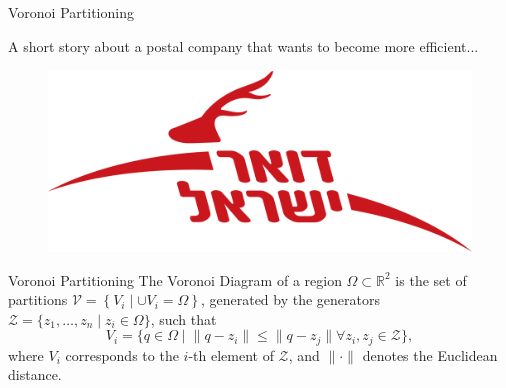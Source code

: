 \documentclass[t]{beamer}
\newcommand{\rsqr}{\mathbb{R}^2}
\begin{document}
\subsection[Voronoi Partitioning]{}
\begin{frame}[label=vorpart1]{Voronoi Partitioning}
\begin{center}
A short story about a postal company that wants to become more efficient...
\end{center}
\begin{figure}
\centering
\includegraphics[scale=0.1]{background/israelpost-logo.png}
\end{figure}
\end{frame}
\begin{frame}[label=vorpart2]{Voronoi Partitioning}
The Voronoi Diagram of a region $\Omega \subset \rsqr$ is the set of partitions $\mathcal{V} = \left\{V_{i} \mid \cup V_{i} = \Omega\right\}$, generated by the generators $\mathcal{Z} = \{z_1,\ldots,z_n\mid z_{i} \in \Omega\}$, such that
\begin{equation*} \label{Voronoi Definition}
V_{i} = \{q\in\Omega \mid \lVert q - z_i \rVert \leq \lVert q - z_j \rVert \forall z_i,z_j\in\mathcal{Z}\},
\end{equation*}
where $V_{i}$ corresponds to the $i$-th element of $\mathcal{Z}$, and $\lVert \cdot \rVert$ denotes the Euclidean distance.
\end{frame}
\end{document}
